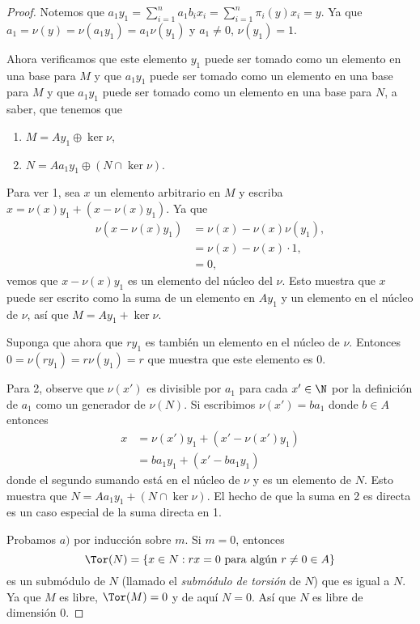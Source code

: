 \begin{proof}
  Notemos que $a_1 y_1 = \sum_{i=1}^n a_1 b_i x_i = \sum_{i=1}^n \pi_i (y) x_i = y$. Ya que $a_1 = \nu(y) = \nu(a_1 y_1) = a_1 \nu(y_1)$ y $a_1 \neq 0$, $\nu(y_1) = 1$.

  Ahora verificamos que este elemento $y_1$ puede ser tomado como un elemento en una base para $M$ y que $a_1 y_1$ puede ser tomado como un elemento en una base para $M$ y que $a_1 y_1$ puede ser tomado como un elemento en una base para $N$, a saber, que tenemos que
  \begin{enumerate}[label=\arabic*.]
    \item $M = Ay_1 \oplus \ker \nu$,
    \item $N = Aa_1y_1 \oplus (N \cap \ker \nu)$.
  \end{enumerate}
  Para ver 1, sea $x$ un elemento arbitrario en $M$ y escriba $x = \nu(x)y_1 + (x-\nu(x)y_1)$. Ya que
  \begin{align*}
    \nu(x-\nu(x)y_1) &= \nu(x) - \nu(x)\nu(y_1), \\
      &= \nu(x) - \nu(x)\cdot 1, \\
      &= 0,
  \end{align*}
  vemos que $x - \nu(x)y_1$ es un elemento del núcleo del $\nu$. Esto muestra que $x$ puede ser escrito como la suma de un elemento en $Ay_1$ y un elemento en el núcleo de $\nu$, así que $M = Ay_1 + \ker \nu$.

  Suponga que ahora que $ry_1$ es también un elemento en el núcleo de $\nu$. Entonces $0 = \nu(ry_1) = r\nu(y_1) = r$ que muestra que este elemento es $0$.

  Para 2, observe que $\nu(x')$ es divisible por $a_1$ para cada $x' \in \N$ por la definición de $a_1$ como un generador de $\nu(N)$. Si escribimos $\nu(x') = ba_1$ donde $b \in A$ entonces
  \begin{align*}
    x &= \nu(x')y_1 + (x' - \nu(x')y_1) \\
      &= ba_1y_1 + (x' - ba_1y_1)
  \end{align*}
  donde el segundo sumando está en el núcleo de $\nu$ y es un elemento de $N$. Esto muestra que $N = Aa_1y_1 + (N \cap \ker \nu)$. El hecho de que la suma en 2 es directa es un caso especial de la suma directa en 1.

  Probamos $a)$ por inducción sobre $m$. Si $m=0$, entonces 
  \[
    \Tor(N) = \{x \in N : rx = 0 \ \text{para algún}\ r \neq 0 \in A\}
  \]
  es un submódulo de $N$ (llamado el \emph{submódulo de torsión} de $N$) que es igual a $N$. Ya que $M$ es libre, $\Tor(M) = 0$ y de aquí $N=0$. Así que $N$ es libre de dimensión $0$.


\end{proof}
